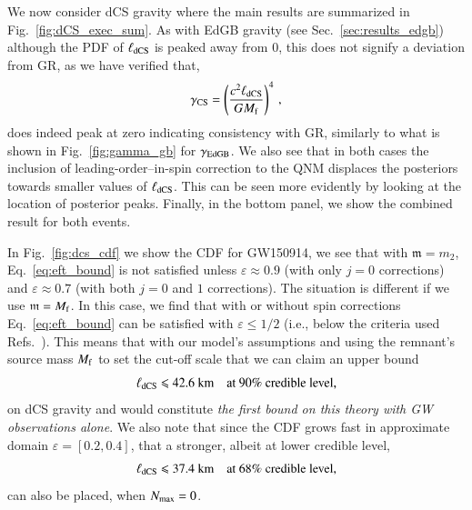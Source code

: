 \documentclass[twocolumn,
               prd,
               aps,
               superscriptaddress,
               tightenlines,
               nofootinbib,
               eqsecnum,
               amsfonts,
               amsmath,
               longbibliography]{revtex4-1}
\newcommand{\gm}{\mathfrak{m}}
\newcommand{\agcomm}[1]{{\textcolor{red}{{[AG: #1]}}}}
\begin{document}
We now consider dCS gravity where the main results are summarized in Fig.~\ref{fig:dCS_exec_sum}.
%
As with EdGB gravity (see Sec.~\ref{sec:results_edgb}) although the PDF of $\ell_{\rm dCS}$
is peaked away from 0, this does not signify a deviation from GR, as we have verified that,
%
\begin{equation}
    \gamma_{\rm CS} = \left( \frac{c^2 \ell_{\rm dCS}}{G M_{\rm f}} \right)^{4}\,,
\end{equation}
%
does indeed peak at zero indicating consistency with GR, similarly to what is
shown in Fig.~\ref{fig:gamma_gb} for $\gamma_{\rm EdGB}$.
%
We also see that in both cases the inclusion of leading-order--in-spin
correction to the QNM displaces the posteriors towards smaller values of
$\ell_{\rm dCS}$. This can be seen more evidently by looking at the location of
posterior peaks.
%
Finally, in the bottom panel, we show the combined result for both events.

In Fig.~\ref{fig:dcs_cdf} we show the CDF for GW150914, we see that with $\gm = m_2$,
Eq.~\eqref{eq:eft_bound} is not satisfied unless $\varepsilon \approx 0.9$ (with only $j=0$ corrections) and
$\varepsilon \approx 0.7$ (with both $j=0$ and $1$ corrections).
%
The situation is different if we use $\gm = M_{\rm f}$. In this case, we find that
with or without spin corrections Eq.~\eqref{eq:eft_bound} can be satisfied
with $\varepsilon \leqslant 1/2$ (i.e., below the criteria used
Refs.~\cite{Nair:2019iur,Perkins:2021mhb,Lyu:2022gdr}).
%
This means that with our model's assumptions and using the remnant's source mass $M_{\rm f}$ to set the
cut-off scale that we can claim an upper bound
%
\begin{equation}
\ell_{\rm dCS} \leqslant 42.6~\textrm{km}
\quad \textrm{at 90\% credible level},
\end{equation}
%
on dCS gravity and would constitute \emph{the first bound on this theory with GW
observations alone}.
%
We also note that since the CDF grows fast in approximate domain $\varepsilon = [0.2, 0.4]$,
that a stronger, albeit at lower credible level,
%
\begin{equation}
\ell_{\rm dCS} \leqslant 37.4~\textrm{km}
\quad \textrm{at 68\% credible level},
\end{equation}
%
can also be placed, when $N_{\rm max}=0$.
\end{document}
